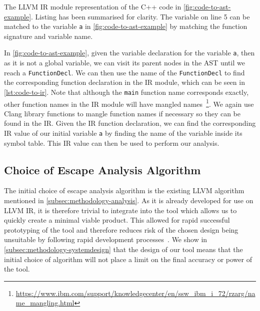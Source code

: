 \documentclass{mpaper}
\begin{document}
    \begin{listing}
        \inputminted{llvm}{code/code-to-ir.ll}
        \caption{The LLVM IR module representation of the C++ code in \autoref{fig:code-to-ast-example}. Listing has been summarised for clarity. The variable on line 5 can be matched to the variable \texttt{a} in \autoref{fig:code-to-ast-example} by matching the function signature and variable name.}
        \label{lst:code-to-ir}
    \end{listing}
    
    In \autoref{fig:code-to-ast-example}, given the variable declaration for the variable \texttt{a}, then as it is not a global variable, we can visit its parent nodes in the AST until we reach a \texttt{FunctionDecl}.
    We can then use the name of the \texttt{FunctionDecl} to find the corresponding function declaration in the IR module, which can be seen in  \autoref{lst:code-to-ir}.
    Note that although the \texttt{main} function name corresponds exactly, other function names in the IR module will have mangled names~\footnote{\url{https://www.ibm.com/support/knowledgecenter/en/ssw_ibm_i_72/rzarg/name_mangling.html}}.
    We again use Clang library functions to mangle function names if necessary so they can be found in the IR. 
    Given the IR function declaration, we can find the corresponding IR value of our initial variable \texttt{a} by finding the name of the variable inside its symbol table.
    This IR value can then be used to perform our analysis.

    \subsection{Choice of Escape Analysis Algorithm}
    
    The initial choice of escape analysis algorithm is the existing LLVM algorithm mentioned in \autoref{subsec:methodology-analysis}.
    As it is already developed for use on LLVM IR, it is therefore trivial to integrate into the tool which allows us to quickly create a minimal viable product. 
    This allowed for rapid successful prototyping of the tool and therefore reduces risk of the chosen design being unsuitable by following rapid development processes~\cite{Martin1991}.
    We show in \autoref{subsec:methodology-systemdesign} that the design of our tool means that the initial choice of algorithm will not place a limit on the final accuracy or power of the tool.
    
\end{document}
